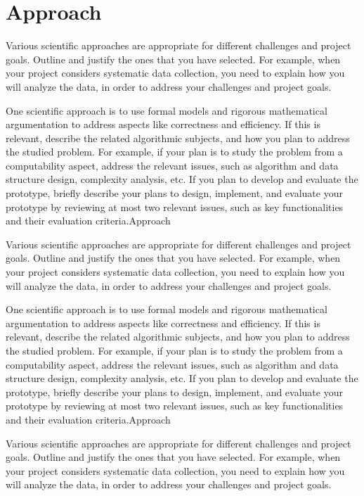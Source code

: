 \section{Approach}

Various scientific approaches are appropriate for different challenges and project goals.
Outline and justify the ones that you have selected.
For example, when your project considers systematic data collection, you need to explain how you will analyze the data, in order to address your challenges and project goals.

One scientific approach is to use formal models and rigorous mathematical argumentation to address aspects like correctness and efficiency.
If this is relevant, describe the related algorithmic subjects, and how you plan to address the studied problem.
For example, if your plan is to study the problem from a computability aspect, address the relevant issues, such as algorithm and data structure design, complexity analysis, etc.
If you plan to develop and evaluate the prototype, briefly describe your plans to design, implement, and evaluate your prototype by reviewing at most two relevant issues, such as key functionalities and their evaluation criteria.{Approach}

Various scientific approaches are appropriate for different challenges and project goals.
Outline and justify the ones that you have selected.
For example, when your project considers systematic data collection, you need to explain how you will analyze the data, in order to address your challenges and project goals.

One scientific approach is to use formal models and rigorous mathematical argumentation to address aspects like correctness and efficiency.
If this is relevant, describe the related algorithmic subjects, and how you plan to address the studied problem.
For example, if your plan is to study the problem from a computability aspect, address the relevant issues, such as algorithm and data structure design, complexity analysis, etc.
If you plan to develop and evaluate the prototype, briefly describe your plans to design, implement, and evaluate your prototype by reviewing at most two relevant issues, such as key functionalities and their evaluation criteria.{Approach}

Various scientific approaches are appropriate for different challenges and project goals.
Outline and justify the ones that you have selected.
For example, when your project considers systematic data collection, you need to explain how you will analyze the data, in order to address your challenges and project goals.

